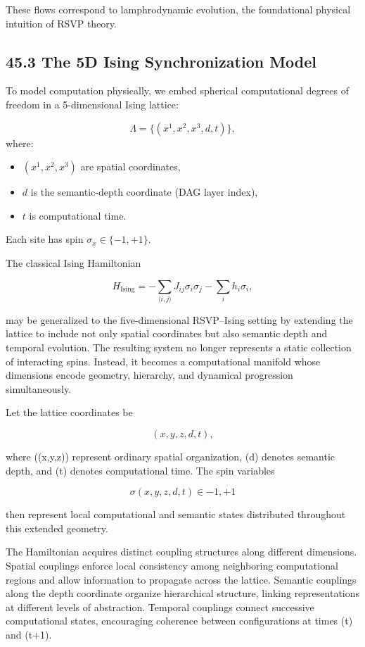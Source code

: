 \documentclass[12pt,letterpaper]{article}
\theoremstyle{remark}
\begin{document}
These flows correspond to lamphrodynamic evolution, 
the foundational physical intuition of RSVP theory.

\subsection{45.3 The 5D Ising Synchronization Model}

To model computation physically, we embed spherical computational degrees of freedom 
in a 5-dimensional Ising lattice:

\[
\Lambda = \{(x^1,x^2,x^3,d,t)\},
\]
where:

\begin{itemize}
  \item $(x^1,x^2,x^3)$ are spatial coordinates,
  \item $d$ is the semantic-depth coordinate (DAG layer index),
  \item $t$ is computational time.
\end{itemize}

Each site has spin $\sigma_{x} \in \{-1, +1\}$.  

The classical Ising Hamiltonian

\[
H_{\text{Ising}} =
-\sum_{\langle i,j\rangle} J_{ij}\sigma_i\sigma_j
-\sum_i h_i\sigma_i,
\]

may be generalized to the five-dimensional RSVP--Ising setting by extending the lattice to include not only spatial coordinates but also semantic depth and temporal evolution. The resulting system no longer represents a static collection of interacting spins. Instead, it becomes a computational manifold whose dimensions encode geometry, hierarchy, and dynamical progression simultaneously.

Let the lattice coordinates be

\[
(x,y,z,d,t),
\]

where ((x,y,z)) represent ordinary spatial organization, (d) denotes semantic depth, and (t) denotes computational time. The spin variables

\[
\sigma(x,y,z,d,t)\in{-1,+1}
\]

then represent local computational and semantic states distributed throughout this extended geometry.

The Hamiltonian acquires distinct coupling structures along different dimensions. Spatial couplings enforce local consistency among neighboring computational regions and allow information to propagate across the lattice. Semantic couplings along the depth coordinate organize hierarchical structure, linking representations at different levels of abstraction. Temporal couplings connect successive computational states, encouraging coherence between configurations at times (t) and (t+1).
\end{document}
